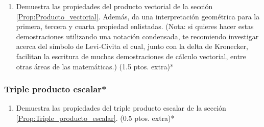 \documentclass[12pt]{article}
\begin{document}
\begin{enumerate}
    \item Demuestra las propiedades del producto vectorial de la sección \ref{Prop:Producto_vectorial}. Además, da una interpretación geométrica para la primera, tercera y cuarta propiedad enlistadas. (Nota: si quieres hacer estas demostraciones utilizando una notación condensada, te recomiendo investigar acerca del símbolo de Levi-Civita el cual, junto con la delta de Kronecker, facilitan la escritura de muchas demostraciones de cálculo vectorial, entre otras áreas de las matemáticas.) (1.5 ptos. extra)*
\end{enumerate}

\subsubsection{Triple producto escalar*}

\begin{enumerate}
    \item Demuestra las propiedades del triple producto escalar de la sección \ref{Prop:Triple_producto_escalar}. (0.5 ptos. extra)*
\end{enumerate}{}
\end{document}
